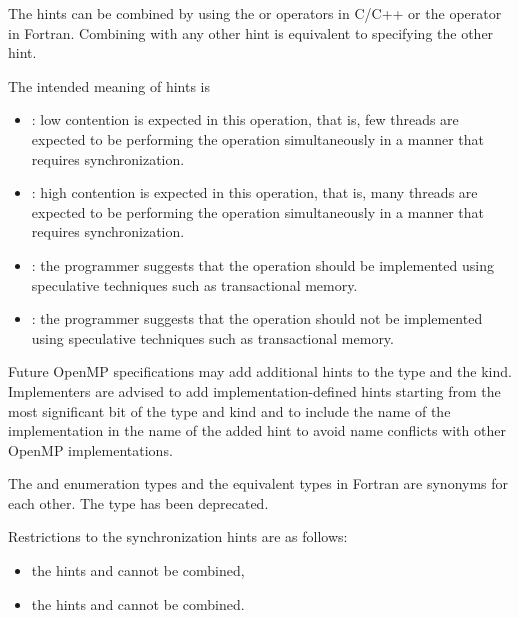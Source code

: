 The hints can be combined by using the \code{+} or \code{|} operators in C/C++ or the \code{+} operator in Fortran.
Combining  with any other hint is equivalent to specifying the other hint.

The intended meaning of hints is
\begin{itemize}
\item {}: low contention is expected in this operation, that is,
few threads are expected to be performing the operation simultaneously in a manner that requires synchronization.
\item {}: high contention is expected in this operation, that is,
many threads are expected to be performing the operation simultaneously in a manner that requires synchronization.
\item {}: the programmer suggests that the operation should be implemented using
speculative techniques such as transactional memory.
\item {}: the programmer suggests that the operation should not be
implemented using speculative techniques such as transactional memory.
\end{itemize}

\begin{note}
Future OpenMP specifications may add additional hints to the
 type and the  kind.
Implementers are advised to add implementation-defined hints starting from
the most significant bit of the  type and
 kind and to include the name of the
implementation in the name of the added hint to avoid name conflicts
with other OpenMP implementations.
\end{note}

The  and  enumeration types and the equivalent types in Fortran
are synonyms for each other.
The type  has been deprecated.

\restrictions

Restrictions to the synchronization hints are as follows:
\begin{itemize}
\item the hints  and  cannot be combined,
\item the hints  and  cannot be combined.
\end{itemize}

